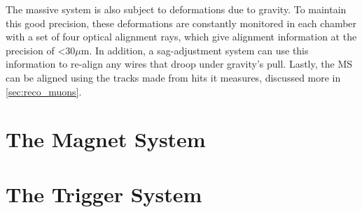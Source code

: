 The massive system is also subject to deformations due to gravity. To maintain this good precision, these deformations are constantly monitored in each chamber with a set of four optical alignment rays, which give alignment information at the precision of <30$\mu$m. In addition, a sag-adjustment system can use this information to re-align any wires that droop under gravity's pull. Lastly, the \ac{MS} can be aligned using the tracks made from hits it measures, discussed more in \autoref{sec:reco_muons}.

\section{The Magnet System}
\label{sec:magnets}

\section{The Trigger System}
\label{sec:Trigger}